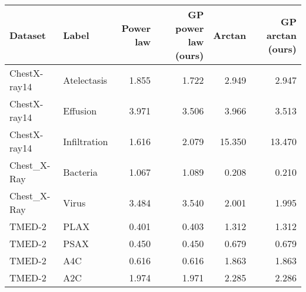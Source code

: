 \begin{tabular}{llrrrr}
\toprule
     Dataset &        Label &  Power law &  GP power law (ours) &  Arctan &  GP arctan (ours) \\
\midrule
ChestX-ray14 &  Atelectasis &      1.855 &                1.722 &   2.949 &             2.947 \\
ChestX-ray14 &     Effusion &      3.971 &                3.506 &   3.966 &             3.513 \\
ChestX-ray14 & Infiltration &      1.616 &                2.079 &  15.350 &            13.470 \\
 Chest\_X-Ray &     Bacteria &      1.067 &                1.089 &   0.208 &             0.210 \\
 Chest\_X-Ray &        Virus &      3.484 &                3.540 &   2.001 &             1.995 \\
      TMED-2 &         PLAX &      0.401 &                0.403 &   1.312 &             1.312 \\
      TMED-2 &         PSAX &      0.450 &                0.450 &   0.679 &             0.679 \\
      TMED-2 &          A4C &      0.616 &                0.616 &   1.863 &             1.863 \\
      TMED-2 &          A2C &      1.974 &                1.971 &   2.285 &             2.286 \\
\bottomrule
\end{tabular}
